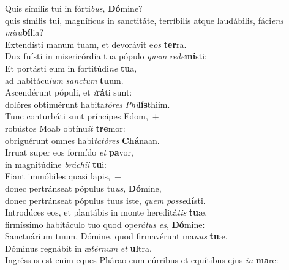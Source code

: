 \evenverse Quis símilis tui in fórti\textit{bus}, \textbf{Dó}mine?~\*\\
\evenverse quis símilis tui, magníficus in sanctitáte, terríbilis atque laudábilis, fáci\textit{ens} \textit{mi}\textit{ra}\textbf{bí}lia?\\
\oddverse Extendísti manum tuam, et devorávit e\textit{os} \textbf{ter}ra.~\*\\
\oddverse Dux fuísti in misericórdia tua pópulo \textit{quem} \textit{re}\textit{de}\textbf{mí}sti:\\
\evenverse Et portásti eum in fortitúdi\textit{ne} \textbf{tu}a,~\*\\
\evenverse ad habitácu\textit{lum} \textit{san}\textit{ctum} \textbf{tu}um.\\
\oddverse Ascendérunt pópuli, et \textit{i}\textbf{rá}ti sunt:~\*\\
\oddverse dolóres obtinuérunt habita\textit{tó}\textit{res} \textit{Phi}\textbf{lís}thiim.\\
\evenverse Tunc conturbáti sunt príncipes Edom,~+\\
\evenverse  robústos Moab obtínu\textit{it} \textbf{tre}mor:~\*\\
\evenverse obriguérunt omnes habi\textit{ta}\textit{tó}\textit{res} \textbf{Chá}naan.\\
\oddverse Irruat super eos formído \textit{et} \textbf{pa}vor,~\*\\
\oddverse in magnitúdine \textit{brá}\textit{chi}\textit{i} \textbf{tu}i:\\
\evenverse Fiant immóbiles quasi lapis,~+\\
\evenverse  donec pertránseat pópulus tu\textit{us}, \textbf{Dó}mine,~\*\\
\evenverse donec pertránseat pópulus tuus iste, \textit{quem} \textit{pos}\textit{se}\textbf{dí}sti.\\
\oddverse Introdúces eos, et plantábis in monte hereditá\textit{tis} \textbf{tu}æ,~\*\\
\oddverse firmíssimo habitáculo tuo quod ope\textit{rá}\textit{tus} \textit{es}, \textbf{Dó}mine:\\
\evenverse Sanctuárium tuum, Dómine, quod firmavérunt ma\textit{nus} \textbf{tu}æ.~\*\\
\evenverse Dóminus regnábit in æ\textit{tér}\textit{num} \textit{et} \textbf{ul}tra.\\
\oddverse Ingréssus est enim eques Phárao cum cúrribus et equítibus ejus \textit{in} \textbf{ma}re:~\*\\
